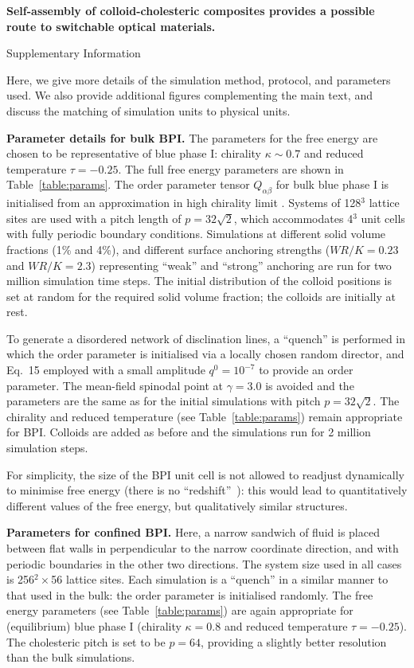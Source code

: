 \documentclass[12pt,twoside]{article}
\begin{document}
{\bf
Self-assembly of colloid-cholesteric
composites provides a possible route to switchable optical materials.

Supplementary Information}

Here, we give more details of the simulation method, protocol, and parameters used. We also provide additional figures complementing the main text, and discuss the matching of simulation units to physical units. 

\noindent
\textbf{Parameter details for bulk BPI.}
The parameters for the free energy are chosen to be representative
of blue phase I: chirality $\kappa \sim 0.7$ and reduced temperature
$\tau = -0.25$.
The full free energy parameters are shown in Table~\ref{table:params}.
The order parameter tensor $Q_{\alpha\beta}$ for bulk blue phase I is
initialised from an approximation in high chirality limit
\cite{blue1,oliver1}. Systems of 128$^3$ lattice sites are
used with a pitch length of $p = 32\sqrt{2}$, which accommodates 4$^3$
unit cells with fully periodic boundary conditions.
Simulations at different solid volume fractions (1\% and 4\%), and different 
surface anchoring strengths ($WR/K = 0.23$ and $WR/K = 2.3$) representing
``weak'' and ``strong'' anchoring are run for two million simulation
time steps.
The initial distribution of the colloid positions is set at random
for the required solid volume fraction; the colloids are initially
at rest.

To generate a disordered network of disclination lines, a ``quench''
is performed in which the order parameter is initialised via a
locally chosen random director, and
Eq.~15
employed with a small amplitude $q^0 = 10^{-7}$ to
provide an order parameter.
The mean-field spinodal point at $\gamma = 3.0$ is avoided and
the parameters are the same as for the initial simulations with
pitch $p = 32\sqrt{2}$. The chirality and reduced temperature (see
Table~\ref{table:params}) remain appropriate for BPI.
Colloids are added as before and the simulations run for 2 million
simulation steps.

For simplicity,  the size of the BPI unit cell is not allowed to 
readjust dynamically to minimise free energy (there is no 
``redshift''~\cite{blue1}): this would lead to quantitatively different 
values of the free energy, but qualitatively similar structures. 

\noindent
\textbf{Parameters for confined BPI.}
Here, a narrow sandwich of fluid is placed between flat walls in
perpendicular to the narrow coordinate direction, and with periodic
boundaries in the other two directions. The system size used in all
cases is 256$^2 \times$56 lattice sites. Each simulation is a ``quench''
in a similar manner to that used in the bulk: the order parameter is
initialised randomly. The free energy parameters (see Table~\ref{table:params})
are again appropriate for (equilibrium) blue phase I
(chirality $\kappa = 0.8$ and
reduced temperature $\tau = -0.25$). The cholesteric pitch is set
to be $p = 64$, providing a slightly better resolution than the bulk
simulations.
\end{document}
